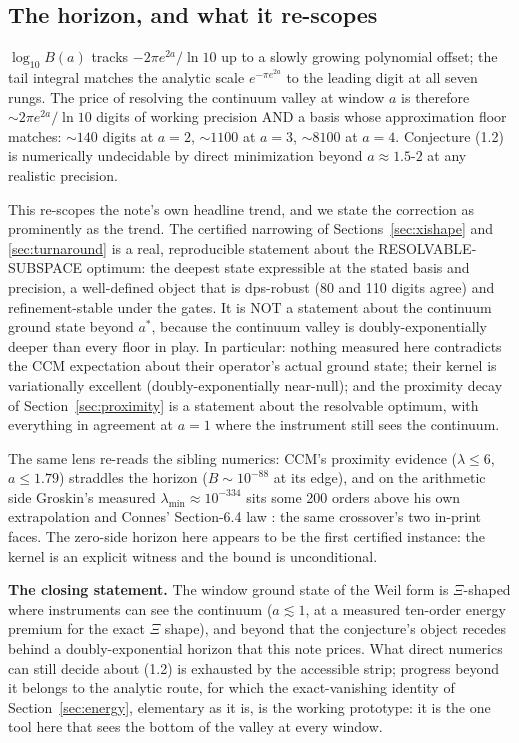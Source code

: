 \documentclass[10pt]{article}
\begin{document}
\subsection{The horizon, and what it re-scopes}\label{sec:horizonsub}

$\log_{10} B(a)$ tracks $-2\pi e^{2a}/\ln 10$ up to a slowly growing polynomial offset; the tail integral matches the analytic scale $e^{-\pi e^{2a}}$ to the leading digit at all seven rungs. The price of resolving the continuum valley at window $a$ is therefore $\sim 2\pi e^{2a}/\ln 10$ digits of working precision AND a basis whose approximation floor matches: $\sim 140$ digits at $a = 2$, $\sim 1100$ at $a = 3$, $\sim 8100$ at $a = 4$. Conjecture (1.2) is numerically undecidable by direct minimization beyond $a \approx 1.5$-$2$ at any realistic precision.

This re-scopes the note's own headline trend, and we state the correction as prominently as the trend. The certified narrowing of Sections~\ref{sec:xishape} and \ref{sec:turnaround} is a real, reproducible statement about the RESOLVABLE-SUBSPACE optimum: the deepest state expressible at the stated basis and precision, a well-defined object that is dps-robust (80 and 110 digits agree) and refinement-stable under the gates. It is NOT a statement about the continuum ground state beyond $a^*$, because the continuum valley is doubly-exponentially deeper than every floor in play. In particular: nothing measured here contradicts the CCM expectation about their operator's actual ground state; their kernel is variationally excellent (doubly-exponentially near-null); and the proximity decay of Section~\ref{sec:proximity} is a statement about the resolvable optimum, with everything in agreement at $a = 1$ where the instrument still sees the continuum.

The same lens re-reads the sibling numerics: CCM's proximity evidence ($\lambda \le 6$, $a \le 1.79$) straddles the horizon ($B \sim 10^{-88}$ at its edge), and on the arithmetic side Groskin's measured $\lambda_{\min} \approx 10^{-334}$ sits some 200 orders above his own extrapolation and Connes' Section-6.4 law \cite{G26a,C26}: the same crossover's two in-print faces. The zero-side horizon here appears to be the first certified instance: the kernel is an explicit witness and the bound is unconditional.

\textbf{The closing statement.} The window ground state of the Weil form is $\Xi$-shaped where instruments can see the continuum ($a \lesssim 1$, at a measured ten-order energy premium for the exact $\Xi$ shape), and beyond that the conjecture's object recedes behind a doubly-exponential horizon that this note prices. What direct numerics can still decide about (1.2) is exhausted by the accessible strip; progress beyond it belongs to the analytic route, for which the exact-vanishing identity of Section~\ref{sec:energy}, elementary as it is, is the working prototype: it is the one tool here that sees the bottom of the valley at every window.
\end{document}
